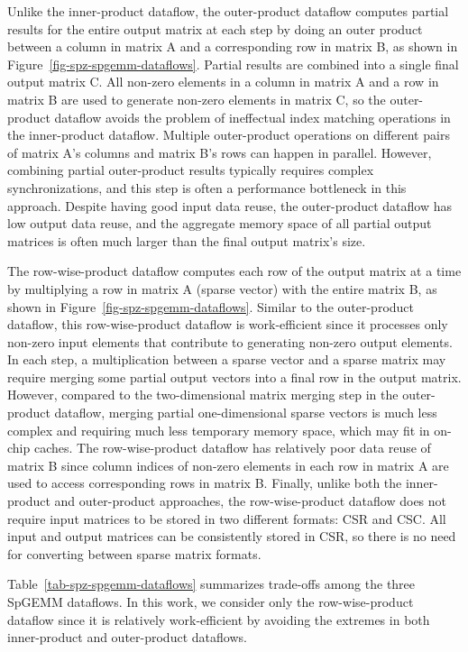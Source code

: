 Unlike the inner-product dataflow, the outer-product dataflow computes partial
results for the entire output matrix at each step by doing an outer product
between a column in matrix A and a corresponding row in matrix B, as shown in
Figure~\ref{fig-spz-spgemm-dataflows}.
Partial results are combined into a single final output matrix C.
All non-zero elements in a column in matrix A and a row in matrix B are used to
generate non-zero elements in matrix C, so the outer-product dataflow avoids
the problem of ineffectual index matching operations in the inner-product
dataflow.
Multiple outer-product operations on different pairs of matrix A's columns and
matrix B's rows can happen in parallel.
However, combining partial outer-product results typically requires complex
synchronizations, and this step is often a performance bottleneck in this
approach.
Despite having good input data reuse, the outer-product dataflow has low output
data reuse, and the aggregate memory space of all partial output matrices is
often much larger than the final output matrix's size.

The row-wise-product dataflow computes each row of the output matrix at a time
by multiplying a row in matrix A (sparse vector) with the entire matrix
B, as shown in Figure~\ref{fig-spz-spgemm-dataflows}.
Similar to the outer-product dataflow, this row-wise-product dataflow is
work-efficient since it processes only non-zero input elements that contribute
to generating non-zero output elements.
In each step, a multiplication between a sparse vector and a sparse matrix may
require merging some partial output vectors into a final row in the output
matrix.
However, compared to the two-dimensional matrix merging step in the
outer-product dataflow, merging partial one-dimensional sparse vectors is much
less complex and requiring much less temporary memory space, which may fit in
on-chip caches.
The row-wise-product dataflow has relatively poor data reuse of matrix B since
column indices of non-zero elements in each row in matrix A are used to access
corresponding rows in matrix B.
Finally, unlike both the inner-product and outer-product approaches, the
row-wise-product dataflow does not require input matrices to be stored in two
different formats: CSR and CSC.
All input and output matrices can be consistently stored in CSR, so there is no
need for converting between sparse matrix formats.



Table~\ref{tab-spz-spgemm-dataflows} summarizes trade-offs among the three
SpGEMM dataflows.
In this work, we consider only the row-wise-product dataflow since it is
relatively work-efficient by avoiding the extremes in both inner-product and
outer-product dataflows.

